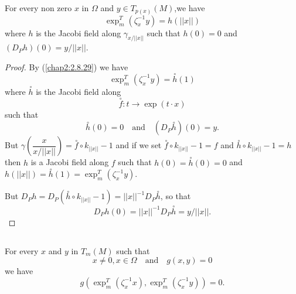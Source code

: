 \begin{prop*}
For every non zero $x$ in $\Omega$ and $y\in
T_{p(x)}(M)$,\pageoriginale we have
$$
\exp^{T}_{m}(\zeta^{-1}_{x}y)=h(||x||)
$$
where $h$ is the Jacobi field along $\gamma_{x/||x||}$ such that
$h(0)=0$ and\break $(D_{P}h)(0)=y/||x||$.
\end{prop*}

\begin{proof}
By (\ref{chap2:2.8.29}) we have
$$
\exp^{T}_{m}(\zeta^{-1}_{x}y)=\overset{\circ}{h} (1)
$$
where $\overset{\circ}{h}$ is the Jacobi field along
$$
\overset{\circ}{f}:t\to \exp (t\cdot x)
$$
such that
$$
\overset{\circ}{h}(0)=0\quad\text{and}\quad (D_{P}\overset{\circ}{h})(0)=y.
$$
But $\gamma\left(\dfrac{x}{x/||x||}\right)=\overset{\circ}{f}\circ
k_{||x||}-1$ and if we set $\overset{\circ}{f}\circ k_{||x||}-1=f$ and
$\overset{\circ}{h}\circ k_{||x||}-1=h$ then $h$ is a Jacobi field
along $f$ such that $h(0)=\overset{\circ}{h}(0)=0$ and
$h(||x||)=\overset{\circ}{h}(1)=\exp^{T}_{m}\left(\zeta^{-1}_{x}y\right)$. 

But $D_{P}h=D_{P}(\overset{\circ}{h}\circ
k_{||x||}-1)=||x||^{-1}D_{P}\overset{\circ}{h}$, so that
$$
D_{P}h(0)=||x||^{-1}D_{P}\overset{\circ}{h}=y/||x||.
$$
\end{proof}


\subsection{}\label{chap5:5.6.24}

\begin{gausslemma*}
For every $x$ and $y$ in $T_{m}(M)$ such that
\begin{equation*}
x\neq 0, x\in\Omega\quad\text{and}\quad g(x,y)=0\tag{5.6.25}\label{chap5:5.6.25}
\end{equation*}
we have
$$
g(\exp^{T}_{m}(\zeta^{-1}_{x}x),\exp^{T}_{m}(\zeta^{-1}_{x}y))=0.
$$
\end{gausslemma*}

